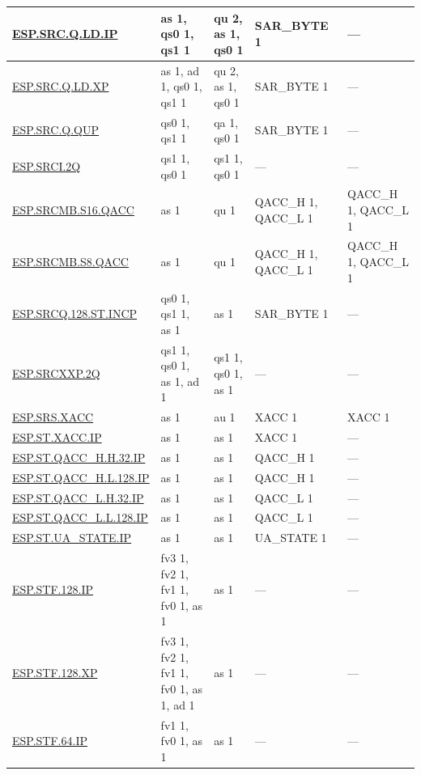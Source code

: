 \begin{longtable}[c]{|l|m{2.5cm}|m{2.5cm}|m{2.5cm}|m{2.5cm}|}
    \hyperref[instruction:ESPSRCQLDIP]{ESP.SRC.Q.LD.IP} & as 1, qs0 1, qs1 1 & qu 2, as 1, qs0 1 & SAR\_BYTE 1 & — \\\hline
    \hyperref[instruction:ESPSRCQLDXP]{ESP.SRC.Q.LD.XP} & as 1, ad 1, qs0 1, qs1 1 & qu 2, as 1, qs0 1 & SAR\_BYTE 1 & — \\\hline
    \hyperref[instruction:ESPSRCQQUP]{ESP.SRC.Q.QUP} & qs0 1, qs1 1 & qa 1, qs0 1 & SAR\_BYTE 1 & — \\\hline
    \hyperref[instruction:ESPSRCI2Q]{ESP.SRCI.2Q} & qs1 1, qs0 1 & qs1 1, qs0 1 & — & — \\\hline
    \hyperref[instruction:ESPSRCMBS16QACC]{ESP.SRCMB.S16.QACC} & as 1 & qu 1 & QACC\_H 1, QACC\_L 1 & QACC\_H 1, QACC\_L 1\\\hline
    \hyperref[instruction:ESPSRCMBS8QACC]{ESP.SRCMB.S8.QACC} & as 1 & qu 1 & QACC\_H 1, QACC\_L 1 & QACC\_H 1, QACC\_L 1\\\hline
    \hyperref[instruction:ESPSRCQ128STINCP]{ESP.SRCQ.128.ST.INCP} & qs0 1, qs1 1, as 1 & as 1 & SAR\_BYTE 1 & — \\\hline
    \hyperref[instruction:ESPSRCXXP2Q]{ESP.SRCXXP.2Q} & qs1 1, qs0 1, as 1, ad 1 & qs1 1, qs0 1, as 1 & — & — \\\hline
    \hyperref[instruction:ESPSRSXACC]{ESP.SRS.XACC} & as 1 & au 1 & XACC 1 & XACC 1\\\hline
    \hyperref[instruction:ESPSTXACCIP]{ESP.ST.XACC.IP} & as 1 & as 1 & XACC 1 & — \\\hline
    \hyperref[instruction:ESPSTQACCHH32IP]{ESP.ST.QACC\_H.H.32.IP} & as 1 & as 1 & QACC\_H 1 & — \\\hline
    \hyperref[instruction:ESPSTQACCHL128IP]{ESP.ST.QACC\_H.L.128.IP} & as 1 & as 1 & QACC\_H 1 & — \\\hline
    \hyperref[instruction:ESPSTQACCLH32IP]{ESP.ST.QACC\_L.H.32.IP} & as 1 & as 1 & QACC\_L 1 & — \\\hline
    \hyperref[instruction:ESPSTQACCLL128IP]{ESP.ST.QACC\_L.L.128.IP} & as 1 & as 1 & QACC\_L 1 & — \\\hline
    \hyperref[instruction:ESPSTUASTATEIP]{ESP.ST.UA\_STATE.IP} & as 1 & as 1 & UA\_STATE 1 & — \\\hline
    \hyperref[instruction:ESPSTF128IP]{ESP.STF.128.IP} & fv3 1, fv2 1, fv1 1, fv0 1, as 1 & as 1 & — & — \\\hline
    \hyperref[instruction:ESPSTF128XP]{ESP.STF.128.XP} & fv3 1, fv2 1, fv1 1, fv0 1, as 1, ad 1 & as 1 & — & — \\\hline
    \hyperref[instruction:ESPSTF64IP]{ESP.STF.64.IP} & fv1 1, fv0 1, as 1 & as 1 & — & — \\\hline

\end{longtable}
